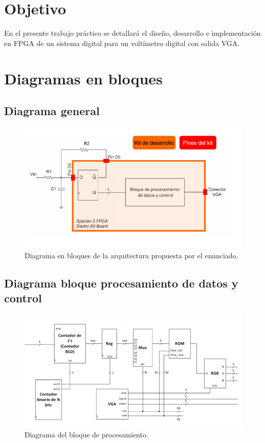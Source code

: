 \documentclass[a4paper,10pt]{article}
\begin{document}

\newpage
\tableofcontents
\newpage
\section{Objetivo}
En el presente trabajo práctico se detallará el diseño, desarrollo e implementación en FPGA de un sistema digital para un voltímetro digital con salida VGA.
\section{Diagramas en bloques}
	\subsection{Diagrama general}
	\begin{figure}[h]
		\centering
		\includegraphics{img/general.png}
		\caption{Diagrama en bloques de la arquitectura propuesta por el enunciado.}
		 \label{glob}
	\end{figure}
	\subsection{Diagrama bloque procesamiento de datos y control}
		\begin{figure}[h]
		\centering
		\includegraphics[width=13cm]{img/fpga.png}
		\caption{Diagrama del bloque de procesamiento.}
	\end{figure}
	
\end{document}

